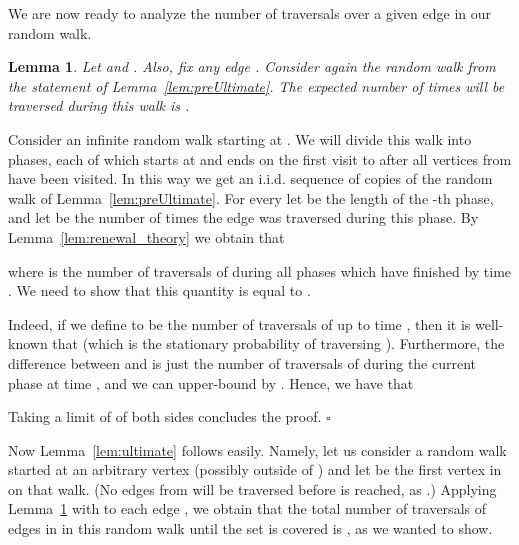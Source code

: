 \documentclass[11pt, letterpaper]{article}
\newtheorem{lemma}[theorem]{Lemma}
\newenvironment{proof}{\noindent{\bf Proof:}\hspace*{1em}}{\qed\bigskip}
\newcommand{\qed}{\hfill\ensuremath{\square}}
\begin{document}
We are now ready to analyze the number of traversals over a given edge  in our random walk. 

\begin{lemma} \label{lem:ultimate_for_one_edge}
Let  and . Also, fix any edge . Consider again the random walk from the statement of Lemma~\ref{lem:preUltimate}. The expected number of times   will be traversed during this walk is .
\end{lemma}
\begin{proof}
Consider an infinite random walk starting at . We will divide this walk into phases, each of which starts at  and ends on the first visit to  after all vertices from  have been visited. In this way we get an i.i.d. sequence of copies of the random walk of Lemma~\ref{lem:preUltimate}. For every  let  be the length of the -th phase, and let  be the number of times the edge  was traversed during this phase. By Lemma~\ref{lem:renewal_theory} we obtain that

where  is the number of traversals of  during all phases which have finished by time . We need to show that this quantity is equal to .

Indeed, if we define  to be the number of traversals of  up to time , then it is well-known
that  (which is the stationary probability of traversing ). Furthermore, the difference between  and  is just the number of traversals of  during the current phase at time , and we can upper-bound  by . Hence, we have that

Taking a limit of  of both sides concludes the proof.
\end{proof}

Now Lemma~\ref{lem:ultimate} follows easily. Namely, let us consider a random walk started at an arbitrary vertex (possibly outside of ) and let  be the first vertex in  on that walk. (No edges from  will be traversed before  is reached, as .) Applying Lemma~\ref{lem:ultimate_for_one_edge} with  to each edge , we obtain that the total number of traversals of edges in  in this random walk until the set  is covered is , as we wanted to show. 
\end{document}
